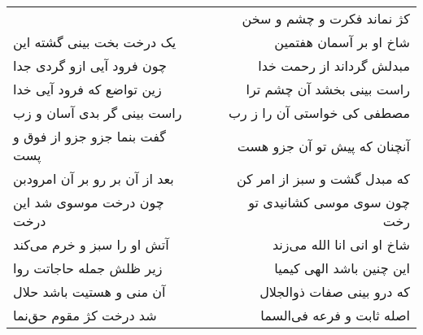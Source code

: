 \begin{center}
\begin{longtable}{l p{0.5cm} r}
&&
کژ نماند فکرت و چشم و سخن
\\
یک درخت بخت بینی گشته این
&&
شاخ او بر آسمان هفتمین
\\
چون فرود آیی ازو گردی جدا
&&
مبدلش گرداند از رحمت خدا
\\
زین تواضع که فرود آیی خدا
&&
راست بینی بخشد آن چشم ترا
\\
راست بینی گر بدی آسان و زب
&&
مصطفی کی خواستی آن را ز رب
\\
گفت بنما جزو جزو از فوق و پست
&&
آنچنان که پیش تو آن جزو هست
\\
بعد از آن بر رو بر آن امرودبن
&&
که مبدل گشت و سبز از امر کن
\\
چون درخت موسوی شد این درخت
&&
چون سوی موسی کشانیدی تو رخت
\\
آتش او را سبز و خرم می‌کند
&&
شاخ او انی انا الله می‌زند
\\
زیر ظلش جمله حاجاتت روا
&&
این چنین باشد الهی کیمیا
\\
آن منی و هستیت باشد حلال
&&
که درو بینی صفات ذوالجلال
\\
شد درخت کژ مقوم حق‌نما
&&
اصله ثابت و فرعه فی‌السما
\\
\end{longtable}
\end{center}

